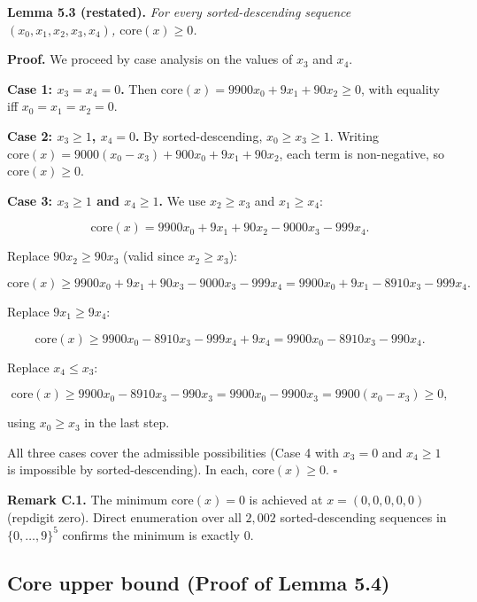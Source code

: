 \documentclass[11pt,letterpaper]{article}
\theoremstyle{paperstyle}
\theoremstyle{paperstyledef}
\theoremstyle{paperstylerem}
\begin{document}
\textbf{Lemma 5.3 (restated).} \emph{For every sorted-descending
sequence \((x_0, x_1, x_2, x_3, x_4)\), \(\mathrm{core}(x) \geq 0\).}

\textbf{Proof.} We proceed by case analysis on the values of \(x_3\) and
\(x_4\).

\textbf{Case 1: \(x_3 = x_4 = 0\).} Then
\(\mathrm{core}(x) = 9900 x_0 + 9 x_1 + 90 x_2 \geq 0\), with equality
iff \(x_0 = x_1 = x_2 = 0\).

\textbf{Case 2: \(x_3 \geq 1\), \(x_4 = 0\).} By sorted-descending,
\(x_0 \geq x_3 \geq 1\). Writing
\(\mathrm{core}(x) = 9000(x_0 - x_3) + 900 x_0 + 9 x_1 + 90 x_2\), each
term is non-negative, so \(\mathrm{core}(x) \geq 0\).

\textbf{Case 3: \(x_3 \geq 1\) and \(x_4 \geq 1\).} We use
\(x_2 \geq x_3\) and \(x_1 \geq x_4\):

\[\mathrm{core}(x) = 9900 x_0 + 9 x_1 + 90 x_2 - 9000 x_3 - 999 x_4.\]

Replace \(90 x_2 \geq 90 x_3\) (valid since \(x_2 \geq x_3\)):

\[\mathrm{core}(x) \geq 9900 x_0 + 9 x_1 + 90 x_3 - 9000 x_3 - 999 x_4 = 9900 x_0 + 9 x_1 - 8910 x_3 - 999 x_4.\]

Replace \(9 x_1 \geq 9 x_4\):

\[\mathrm{core}(x) \geq 9900 x_0 - 8910 x_3 - 999 x_4 + 9 x_4 = 9900 x_0 - 8910 x_3 - 990 x_4.\]

Replace \(x_4 \leq x_3\):

\[\mathrm{core}(x) \geq 9900 x_0 - 8910 x_3 - 990 x_3 = 9900 x_0 - 9900 x_3 = 9900 (x_0 - x_3) \geq 0,\]

using \(x_0 \geq x_3\) in the last step.

All three cases cover the admissible possibilities (Case 4 with
\(x_3 = 0\) and \(x_4 \geq 1\) is impossible by sorted-descending). In
each, \(\mathrm{core}(x) \geq 0\). \(\square\)

\textbf{Remark C.1.} The minimum \(\mathrm{core}(x) = 0\) is achieved at
\(x = (0, 0, 0, 0, 0)\) (repdigit zero). Direct enumeration over all
\(2{,}002\) sorted-descending sequences in \(\{0, \ldots, 9\}^5\)
confirms the minimum is exactly \(0\).

\hypertarget{c.3-core-upper-bound-proof-of-lemma-5.4}{%
\subsection{Core upper bound (Proof of Lemma 5.4)}\label{c.3-core-upper-bound-proof-of-lemma-5.4}}
\end{document}
